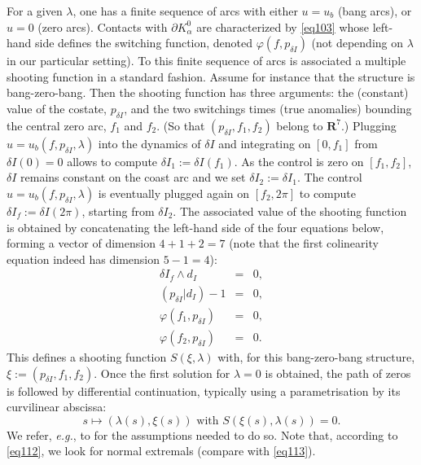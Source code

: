 \documentclass[AMA,STIX1COL]{WileyNJD-v2}
\newcommand{\vphi}{\varphi}
\newcommand{\R}{\mathbf{R}}
\begin{document}
For a given $\lambda$, one has a finite sequence of arcs with either $u=u_b$ (bang arcs),
or $u=0$ (zero arcs). Contacts with $\partial K^0_\alpha$ are characterized by \eqref{eq103} whose
left-hand side defines the switching function, denoted $\vphi(f,p_{\delta I})$ (not depending on
$\lambda$ in our particular setting).
To this finite sequence of arcs is associated a multiple shooting function in a standard fashion.
Assume for instance that the structure is bang-zero-bang.
Then the shooting function has three arguments: the (constant)
value of the costate, $p_{\delta I}$, and the two switchings times (true anomalies) bounding the central zero
arc, $f_1$ and $f_2$. (So that $(p_{\delta I},f_1,f_2)$ belong to $\R^7$.)
Plugging $u=u_b(f,p_{\delta I},\lambda)$ into the dynamics of $\delta I$ and integrating
on $[0,f_1]$ from $\delta I(0)=0$ allows to compute $\delta I_1 := \delta I(f_1)$. As the control is zero on 
$[f_1, f_2]$, $\delta I$ remains constant on the coast arc and we set $\delta I_2 := \delta I_1$. The control
$u=u_b(f,p_{\delta I},\lambda)$ is eventually plugged again on $[f_2,2\pi]$ to compute
$\delta I_f := \delta I(2\pi)$, starting from $\delta I_2$. The associated value of the shooting function is
obtained by concatenating the left-hand side of the four equations below, forming a vector of dimension
$4+1+2=7$ (note that the first colinearity equation indeed has dimension $5-1=4$):
%
\begin{eqnarray}
  \delta I_f \wedge d_I &=& 0,\\
  (p_{\delta I}|d_I) - 1 &=& 0,\\ \label{eq112} 
  \vphi(f_1,p_{\delta I}) &=& 0,\\
  \vphi(f_2,p_{\delta I}) &=& 0.
\end{eqnarray}
%
%
This defines a shooting function $S(\xi,\lambda)$ with, for this bang-zero-bang structure,
$\xi:=(p_{\delta I},f_1,f_2)$. Once the first solution for $\lambda=0$ is obtained, the path of zeros
is followed by differential continuation, typically using a parametrisation by
its curvilinear abscissa:
%
$$ s \mapsto (\lambda(s),\xi(s)) \text{ with } S(\xi(s),\lambda(s)) = 0. $$
%
We refer, \emph{e.g.}, to \cite{caillau-2012b} for the assumptions needed to do so. Note that, according to
\eqref{eq112}, we look for normal extremals (compare with \eqref{eq113}).
\end{document}
